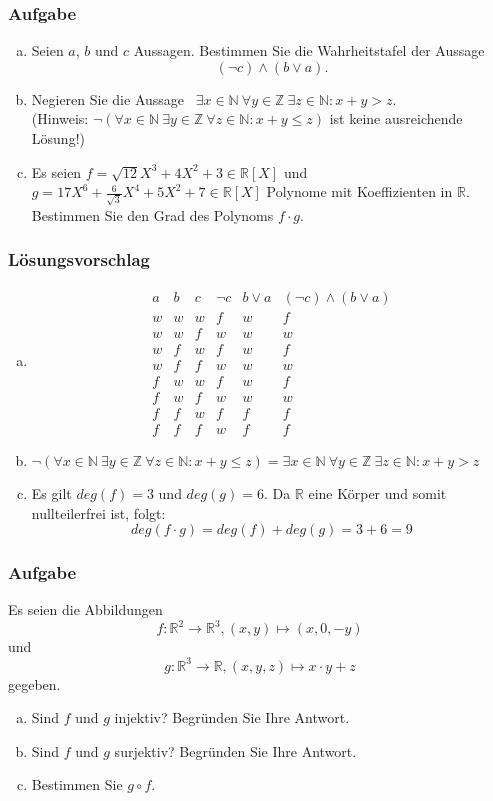 \documentclass[a4paper,11pt]{scrartcl}
\newcounter{auf}
\newcommand{\Aufgabe}%
        {\addtocounter{auf}{1} \subsubsection*{\rmfamily  Aufgabe \theauf \hspace{1em}} }
\newcommand{\N}{\mathbb{N}}
\newcommand{\RR}{\mathbb{R}}
\newcommand{\Z}{\mathbb{Z}}
\begin{document}
\Aufgabe

\begin{enumerate}[a)]

\item Seien $a$, $b$ und $c$  Aussagen. 
Bestimmen Sie die Wahrheitstafel der Aussage
$$
	(\neg c) \land (b \lor a).
$$
\item Negieren Sie die Aussage \ $\exists x \in \N\ \forall y \in \Z\ \exists z \in \N: x+y > z$.\vspace{2mm}\\
(Hinweis: $\neg(\forall x \in \N\ \exists y \in \Z\ \forall z \in \N: x+y \le z)$ ist keine ausreichende Lösung!)\\
\item Es seien $f=\sqrt{12}X^3+4X^2+3 \in \RR[X]$ und $g=17X^6+\frac{6}{\sqrt{3}}X^4+5X^2+7 \in \RR[X]$ Polynome mit Koeffizienten in $\RR$. Bestimmen Sie den Grad des Polynoms $f\cdot g$.
\end{enumerate}
%
%
\subsubsection*{Lösungsvorschlag}
\begin{enumerate}[a)]

\item $$\begin{array}{c|c|c||c|c||c}
a&b&c&\neg c&b\lor a&(\neg c)\land(b\lor a)\\ \hline
w&w&w&f&w&f\\
w&w&f&w&w&w\\
w&f&w&f&w&f\\
w&f&f&w&w&w\\
f&w&w&f&w&f\\
f&w&f&w&w&w\\
f&f&w&f&f&f\\
f&f&f&w&f&f
\end{array}$$
\item $\neg(\forall x \in \N\ \exists y \in \Z\ \forall z \in \N: x+y \le z) = \exists x \in \N \ \forall y \in \Z \ \exists z \in \N: x+y> z$ 
\item Es gilt $deg(f)=3$ und $deg(g)=6$. Da $\RR$ eine Körper und somit nullteilerfrei ist, folgt: 
$$
deg(f\cdot g)=deg(f)+deg(g)=3+6=9
$$
\end{enumerate}
\newpage
\Aufgabe
Es seien die Abbildungen $$f:\RR^2 \to \RR^3, (x,y) \mapsto (x, 0, -y)$$ und $$g: \RR^3 \to \RR, (x,y,z) \mapsto x\cdot y+z$$ gegeben. 
\begin{enumerate}[a)]
\item Sind $f$ und $g$ injektiv? Begründen Sie Ihre Antwort.
\item Sind $f$ und $g$ surjektiv? Begründen Sie Ihre Antwort.
\item Bestimmen Sie $g \circ f$. 
\end{enumerate}
%
%
\end{document}
